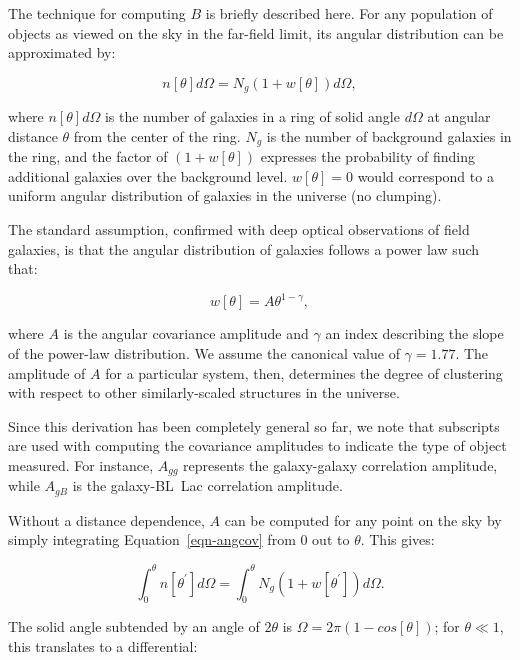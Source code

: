 \documentclass{emulateapj}
\begin{document}
The technique for computing $B$ is briefly described here. For any population of objects as viewed on the sky in the far-field limit, its angular distribution can be approximated by:

\begin{equation}
\label{eqn-angcov}
n[\theta]d\Omega = N_g (1 + w[\theta]) d\Omega,
\end{equation}

\noindent where $n[\theta]d\Omega$ is the number of galaxies in a ring of solid angle $d\Omega$ at angular distance $\theta$ from the center of the ring. $N_g$ is the number of background galaxies in the ring, and the factor of $(1+w[\theta])$ expresses the probability of finding additional galaxies over the background level. $w[\theta]=0$ would correspond to a uniform angular distribution of galaxies in the universe (no clumping). 

The standard assumption, confirmed with deep optical observations of field galaxies, is that the angular distribution of galaxies follows a power law such that:

\begin{equation}
\label{eqn-wtheta}
w[\theta] = A\theta^{1-\gamma},
\end{equation}

\noindent where $A$ is the angular covariance amplitude and $\gamma$ an index describing the slope of the power-law distribution. We assume the canonical value of $\gamma=1.77$. The amplitude of $A$ for a particular system, then, determines the degree of clustering with respect to other similarly-scaled structures in the universe. 

Since this derivation has been completely general so far, we note that subscripts are used with computing the covariance amplitudes to indicate the type of object measured. For instance, $A_{gg}$ represents the galaxy-galaxy correlation amplitude, while $A_{gB}$ is the galaxy-BL~Lac correlation amplitude. 

Without a distance dependence, $A$ can be computed for any point on the sky by simply integrating Equation~\ref{eqn-angcov} from 0 out to $\theta$. This gives:

\begin{equation}
\label{eqn-angint1}
\int^\theta_0 n[\theta^\prime]d\Omega = \int^\theta_0 N_g (1 + w[\theta^\prime]) d\Omega.
\end{equation}

\noindent The solid angle subtended by an angle of $2\theta$ is $\Omega=2\pi(1-cos[\theta])$; for $\theta\ll1$, this translates to a differential:
\end{document}
